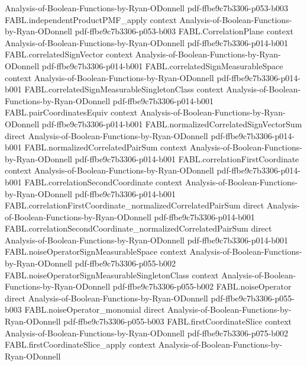 \begin{theorem}
  {Analysis-of-Boolean-Functions-by-Ryan-ODonnell}
  {pdf-ffbe9c7b3306-p053-b003}
\proofstep
  {FABL.independentProductPMF_apply}
  {context}
  {Analysis-of-Boolean-Functions-by-Ryan-ODonnell}
  {pdf-ffbe9c7b3306-p053-b003}
\proofstep
  {FABL.CorrelationPlane}
  {context}
  {Analysis-of-Boolean-Functions-by-Ryan-ODonnell}
  {pdf-ffbe9c7b3306-p014-b001}
\proofstep
  {FABL.correlatedSignVector}
  {context}
  {Analysis-of-Boolean-Functions-by-Ryan-ODonnell}
  {pdf-ffbe9c7b3306-p014-b001}
\proofstep
  {FABL.correlatedSignMeasurableSpace}
  {context}
  {Analysis-of-Boolean-Functions-by-Ryan-ODonnell}
  {pdf-ffbe9c7b3306-p014-b001}
\proofstep
  {FABL.correlatedSignMeasurableSingletonClass}
  {context}
  {Analysis-of-Boolean-Functions-by-Ryan-ODonnell}
  {pdf-ffbe9c7b3306-p014-b001}
\proofstep
  {FABL.pairCoordinatesEquiv}
  {context}
  {Analysis-of-Boolean-Functions-by-Ryan-ODonnell}
  {pdf-ffbe9c7b3306-p014-b001}
\proofstep
  {FABL.normalizedCorrelatedSignVectorSum}
  {direct}
  {Analysis-of-Boolean-Functions-by-Ryan-ODonnell}
  {pdf-ffbe9c7b3306-p014-b001}
\proofstep
  {FABL.normalizedCorrelatedPairSum}
  {context}
  {Analysis-of-Boolean-Functions-by-Ryan-ODonnell}
  {pdf-ffbe9c7b3306-p014-b001}
\proofstep
  {FABL.correlationFirstCoordinate}
  {context}
  {Analysis-of-Boolean-Functions-by-Ryan-ODonnell}
  {pdf-ffbe9c7b3306-p014-b001}
\proofstep
  {FABL.correlationSecondCoordinate}
  {context}
  {Analysis-of-Boolean-Functions-by-Ryan-ODonnell}
  {pdf-ffbe9c7b3306-p014-b001}
\proofstep
  {FABL.correlationFirstCoordinate_normalizedCorrelatedPairSum}
  {direct}
  {Analysis-of-Boolean-Functions-by-Ryan-ODonnell}
  {pdf-ffbe9c7b3306-p014-b001}
\proofstep
  {FABL.correlationSecondCoordinate_normalizedCorrelatedPairSum}
  {direct}
  {Analysis-of-Boolean-Functions-by-Ryan-ODonnell}
  {pdf-ffbe9c7b3306-p014-b001}
\proofstep
  {FABL.noiseOperatorSignMeasurableSpace}
  {context}
  {Analysis-of-Boolean-Functions-by-Ryan-ODonnell}
  {pdf-ffbe9c7b3306-p055-b002}
\proofstep
  {FABL.noiseOperatorSignMeasurableSingletonClass}
  {context}
  {Analysis-of-Boolean-Functions-by-Ryan-ODonnell}
  {pdf-ffbe9c7b3306-p055-b002}
\proofstep
  {FABL.noiseOperator}
  {direct}
  {Analysis-of-Boolean-Functions-by-Ryan-ODonnell}
  {pdf-ffbe9c7b3306-p055-b003}
\proofstep
  {FABL.noiseOperator_monomial}
  {direct}
  {Analysis-of-Boolean-Functions-by-Ryan-ODonnell}
  {pdf-ffbe9c7b3306-p055-b003}
\proofstep
  {FABL.firstCoordinateSlice}
  {context}
  {Analysis-of-Boolean-Functions-by-Ryan-ODonnell}
  {pdf-ffbe9c7b3306-p075-b002}
\proofstep
  {FABL.firstCoordinateSlice_apply}
  {context}
  {Analysis-of-Boolean-Functions-by-Ryan-ODonnell}

\end{theorem}
